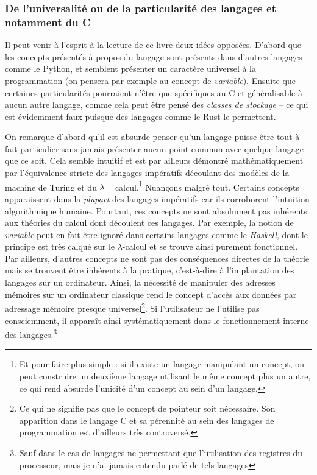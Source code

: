 \documentclass[../../main.tex]{subfiles}
\begin{document}
\subsubsection{De l'universalité ou de la particularité des langages et notamment du C}
Il peut venir à l'esprit à la lecture de ce livre deux idées opposées. D'abord que les concepts présentés à propos du langage sont présents dans d'autres langages comme le Python, et semblent présenter un caractère universel à la programmation (on pensera par exemple au concept de \textit{variable}). Ensuite que certaines particularités pourraient n'être que spécifiques au C et généralisable à aucun autre langage, comme cela peut être pensé des \textit{classes de stockage} -- ce qui est évidemment faux puisque des langages comme le Rust le permettent.
 
On remarque d'abord qu'il est absurde penser qu'un langage puisse être tout à fait particulier sans jamais présenter aucun point commun avec quelque langage que ce soit. Cela semble intuitif et est par ailleurs démontré mathématiquement par l'équivalence stricte des langages impératifs découlant des modèles de la machine de Turing et du $\lambda-$calcul.\footnote{Et pour faire plus simple : si il existe un langage manipulant un concept, on peut construire un deuxième langage utilisant le même concept plus un autre, ce qui rend absurde l'unicité d'un concept au sein d'un langage.}\newline
Nuançons malgré tout. Certains concepts apparaissent dans la \textit{plupart} des langages impératifs car ils corroborent l'intuition algorithmique humaine. Pourtant, ces concepts ne sont absolument pas inhérents aux théories du calcul dont découlent ces langages. Par exemple, la notion de \textit{variable} peut en fait être ignoré dans certains langages comme le \textit{Haskell}, dont le principe est très calqué sur le $\lambda$-calcul et se trouve ainsi purement fonctionnel. Par ailleurs, d'autres concepts ne sont pas des conséquences directes de la théorie mais se trouvent être inhérents à la pratique, c'est-à-dire à l'implantation des langages sur un ordinateur. Ainsi, la nécessité de manipuler des adresses mémoires sur un ordinateur classique rend le concept d'accès aux données par adressage mémoire presque universel\footnote{Ce qui ne signifie pas que le concept de pointeur soit nécessaire. Son apparition dans le langage C et sa pérennité au sein des langages de programmation est d'ailleurs très controversé.}. Si l'utilisateur ne l'utilise pas consciemment, il apparaît ainsi systématiquement dans le fonctionnement interne des langages.\footnote{Sauf dans le cas de langages ne permettant que l'utilisation des registres du processeur, mais je n'ai jamais entendu parlé de tels langages}

\hrulefill
\newpage
\end{document}
